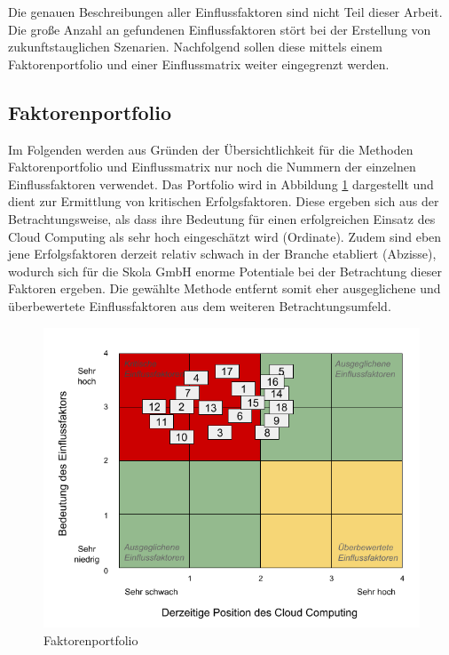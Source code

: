 Die genauen Beschreibungen aller Einflussfaktoren sind nicht Teil dieser Arbeit. Die große Anzahl an gefundenen Einflussfaktoren stört bei der Erstellung von zukunftstauglichen Szenarien. Nachfolgend sollen diese mittels einem Faktorenportfolio und einer Einflussmatrix weiter eingegrenzt werden.


\subsection{Faktorenportfolio}

Im Folgenden werden aus Gründen der Übersichtlichkeit für die Methoden Faktorenportfolio und Einflussmatrix nur noch die Nummern der einzelnen Einflussfaktoren verwendet. Das Portfolio wird in Abbildung \ref{fig:portfolio} dargestellt und dient zur Ermittlung von kritischen Erfolgsfaktoren. Diese ergeben sich aus der Betrachtungsweise, als dass ihre Bedeutung für einen erfolgreichen Einsatz des Cloud Computing als sehr hoch eingeschätzt wird (Ordinate). Zudem sind eben jene Erfolgsfaktoren derzeit relativ schwach in der Branche etabliert (Abzisse), wodurch sich für die Skola GmbH enorme Potentiale bei der Betrachtung dieser Faktoren ergeben. Die gewählte Methode entfernt somit eher ausgeglichene und überbewertete Einflussfaktoren aus dem weiteren Betrachtungsumfeld.

\begin{figure}
	\centering
	\includegraphics[width=\linewidth]{images/portfolio}
	\caption[Caption for parameters]{Faktorenportfolio}
	\label{fig:portfolio}
\end{figure}

